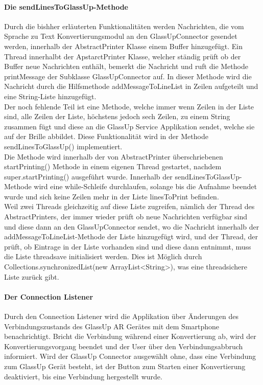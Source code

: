 \paragraph{Die sendLinesToGlassUp-Methode}
Durch die bishher erläuterten Funktionalitäten werden Nachrichten, die vom Sprache zu Text Konvertierungsmodul an den GlassUpConnector gesendet werden, innerhalb der AbstractPrinter Klasse einem Buffer hinzugefügt. Ein Thread innerhalbt der ApstarctPrinter Klasse, welcher ständig prüft ob der Buffer neue Nachrichten enthält, bemerkt die Nachricht und ruft die Methode printMessage der Subklasse GlassUpConnector auf. In dieser Methode wird die Nachricht durch die Hilfsmethode addMessageToLineList in Zeilen aufgeteilt und eine String-Liste hinzugefügt.\\
Der noch fehlende Teil ist eine Methode, welche immer wenn Zeilen in der Liste sind, alle Zeilen der Liste, höchstens jedoch sech Zeilen, zu einem String zusammen fügt und diese an die GlassUp Service Applikation sendet, welche sie auf der Brille abbildet. Diese Funktionalität wird in der Methode sendLinesToGlassUp() implementiert.\\
Die Methode wird innerhalb der von AbstractPrinter überschriebenen startPrinting() Methode in einem eigenen Thread gestartet, nachdem super.startPrinting() ausgeführt wurde. Innerhalb der sendLinesToGlassUp-Methode wird eine while-Schleife durchlaufen, solange bis die Aufnahme beendet wurde  und sich keine Zeilen mehr in der Liste linesToPrint befinden.\\
Weil zwei Threads gleichzeitig auf diese Liste zugreifen, nämlich der Thread des AbstractPrinters, der immer wieder prüft ob neue Nachrichten verfügbar sind und diese dann an den GlassUpConnector sendet, wo die Nachricht innerhalb der addMessageToLineList-Methode der Liste hinzugefügt wird, und der Thread, der prüft, ob Eintrage in der Liste vorhanden sind und diese dann entnimmt, muss die Liste threadsave initialisiert werden. Dies ist Möglich durch Collections.synchronizedList(new ArrayList<String>), was eine threadsichere Liste zurück gibt.
\paragraph{Der Connection Listener}
Durch den Connection Listener wird die Applikation über Änderungen des Verbindungszustands des GlassUp AR Gerätes mit dem Smartphone  benachrichtigt. Bricht die Verbindung während einer Konvertierung ab, wird der Konvertierungsvorgang beendet und der User über den Verbindungsabbruch informiert. Wird der GlassUp Connector ausgewählt ohne, dass eine Verbindung zum GlassUp Gerät besteht, ist der Button zum Starten einer Konvertierung deaktiviert, bis eine Verbindung hergestellt wurde.

